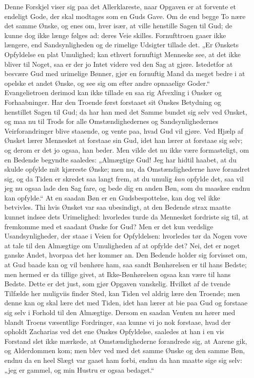 \documentclass[12pt,a4paper]{book}
\begin{document}
Denne Forskjel viser sig paa det Allerklareste, naar Opgaven er at
forvente et endeligt Gode, der skal modtages som en Guds Gave. Om de end
begge To nære det samme Ønske, og enes om, hver især, at ville henstille
Sagen til Gud; de kunne dog ikke længe følges ad: deres Veie skilles.
Fornufttroen gaaer ikke længere, end Sandsynligheden og de rimelige
Udsigter tillade det. „Er Ønskets Opfyldelse en plat Umulighed; kan
ethvert fornuftigt Menneske see, at det ikke bliver til Noget, saa er der
jo Intet videre ved den Sag at gjøre. Istedetfor at besvære Gud med
urimelige
Bønner, gjør en fornuftig Mand da meget bedre i at opelske et andet
Ønske, og see sig om efter andre opnaaelige Goder.“ Evangelietroen
derimod kan ikke tillade en saa rig Afvexling i Ønsker og Forhaabninger.
Har den Troende først forstaaet sit Ønskes Betydning og henstillet Sagen
til Gud; da har han med det Samme bundet sig selv ved Ønsket, og maa nu
til Trods for alle Omstændighedernes og Sandsynlighedernes
Veirforandringer blive staaende, og vente paa, hvad Gud vil gjøre. Ved
Hjælp af Ønsket lærer Mennesket at forstaae sin Gud, idet han lærer at
forstaae sig selv; og derom er det jo ogsaa, han beder. Men vilde det nu
ikke være formasteligt, om en Bedende begyndte saaledes: „Almægtige Gud!
Jeg har hidtil haabet, at du skulde opfylde mit kjæreste Ønske; men nu,
da Omstændighederne have forandret sig, og da Tiden er skredet saa langt
frem, at du umulig \emph{kan} opfylde det, saa vil jeg nu ogsaa lade den
Sag fare, og bede dig en anden Bøn, som du maaskee endnu kan opfylde.“ At
en saadan Bøn er en Gudsbespottelse, kan dog vel ikke betvivles. Thi hvis
Ønsket var saa ubesindigt, at den Bedende strax maatte kunnet indsee dets
Urimelighed: hvorledes turde da Mennesket fordriste sig til, at
fremkomme med et saadant Ønske for Gud? Men er det kun verdslige
Usandsynligheder, der staae i Veien for Opfyldelsen: hvorledes tør da
Nogen vove at tale til den Almægtige om Umuligheden af at opfylde det?
Nei, det er noget ganske Andet, hvorpaa det her kommer an. Den Bedende
holder sig forvisset om, at Gud baade kan og vil bønhøre ham, saa sandt
Bønhørelsen er til hans Bedste; men hermed er da tillige givet, at
Ikke-Bønhørelsen ogsaa kan være til hans Bedste. Dette er det just, som
gjør Opgaven vanskelig. Hvilket af de tvende Tilfælde her muligviis
finder Sted, kan Tiden vel aldrig lære den Troende; men denne kan og skal
lære det med Tiden, idet han lærer at bie paa Gud og forstaae sig selv i
Forhold
til den Almægtige. Dersom en saadan Venten nu hører med blandt Troens
væsentlige Fordringer, saa kunne vi jo nok forstaae, hvad der opholdt
Zacharias ved det ene Ønskes Opfyldelse, saaledes at han i en vis
Forstand slet ikke mærkede, at Omstændighederne forandrede sig, at Aarene
gik, og Alderdommen kom; men blev ved med det samme Ønske og den samme
Bøn, endnu da en heel Slægt var gaaet ham forbi, endnu da han maatte sige
sig selv: „jeg er gammel, og min Hustru er ogsaa bedaget.“
\end{document}
